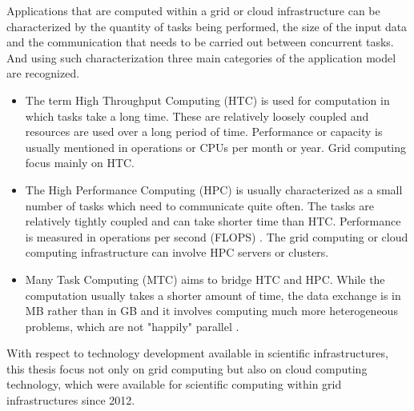 Applications that are computed within a grid or cloud infrastructure can be characterized by the quantity of tasks being performed, the size of the input data and the communication that needs to be carried out between concurrent tasks.
And using such characterization three main categories of the application model are recognized. 
\begin{itemize}
\item
The term High Throughput Computing (HTC) is used for computation in which tasks take a long time. These are relatively loosely coupled and resources are used over a long period of time. Performance or capacity is usually mentioned  in operations or CPUs per month or year. Grid computing focus mainly on HTC.

\item
The High Performance Computing (HPC) is usually characterized as a small number of tasks which need to communicate quite often. The tasks are relatively tightly coupled and can take shorter time than HTC. Performance is measured in operations per second (FLOPS) \cite{Hager2010,Levesque2010}. The grid computing or cloud computing infrastructure can involve HPC servers or clusters.%
\item
Many Task Computing (MTC) aims to bridge HTC and HPC. While the computation usually takes a shorter amount of time, the data exchange is in MB rather than in GB and it involves computing much more heterogeneous problems, which are not "happily" parallel \cite{Raicu2008}. %
\end{itemize}

With respect to technology development available in scientific infrastructures, this thesis focus not only on grid computing but also on cloud computing technology, which were available for scientific computing within grid infrastructures since 2012.

